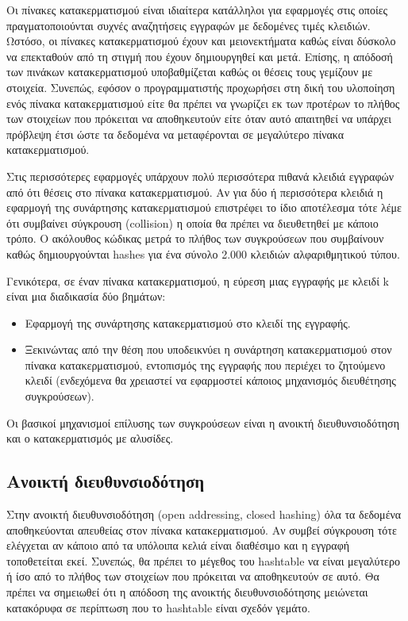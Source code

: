 




Οι πίνακες κατακερματισμού είναι ιδιαίτερα κατάλληλοι για εφαρμογές στις οποίες πραγματοποιούνται συχνές αναζητήσεις εγγραφών με δεδομένες τιμές κλειδιών. Ωστόσο, οι πίνακες κατακερματισμού έχουν και μειονεκτήματα καθώς είναι δύσκολο να επεκταθούν από τη στιγμή που έχουν δημιουργηθεί και μετά. Επίσης, η απόδοσή των πινάκων κατακερματισμού υποβαθμίζεται καθώς οι θέσεις τους γεμίζουν με στοιχεία. Συνεπώς, εφόσον ο προγραμματιστής προχωρήσει στη δική του υλοποίηση ενός πίνακα κατακερματισμού είτε θα πρέπει να γνωρίζει εκ των προτέρων το πλήθος των στοιχείων που πρόκειται να αποθηκευτούν είτε όταν αυτό απαιτηθεί να υπάρχει πρόβλεψη έτσι ώστε τα δεδομένα να μεταφέρονται σε μεγαλύτερο πίνακα κατακερματισμού.

Στις περισσότερες εφαρμογές υπάρχουν πολύ περισσότερα πιθανά κλειδιά εγγραφών από ότι θέσεις στο πίνακα κατακερματισμού. Αν για δύο ή περισσότερα κλειδιά η εφαρμογή της συνάρτησης κατακερματισμού επιστρέφει το ίδιο αποτέλεσμα τότε λέμε ότι συμβαίνει σύγκρουση (collision) η οποία θα πρέπει να διευθετηθεί με κάποιο τρόπο. Ο ακόλουθος κώδικας μετρά το πλήθος των συγκρούσεων που συμβαίνουν καθώς δημιουργούνται hashes για ένα σύνολο 2.000 κλειδιών αλφαριθμητικού τύπου.





Γενικότερα, σε έναν πίνακα κατακερματισμού, η εύρεση μιας εγγραφής με κλειδί k είναι μια διαδικασία δύο βημάτων:
\begin{itemize}[noitemsep]
\item Εφαρμογή της συνάρτησης κατακερματισμού στο κλειδί της εγγραφής.
\item Ξεκινώντας από την θέση που υποδεικνύει η συνάρτηση κατακερματισμού στον πίνακα κατακερματισμού, εντοπισμός της εγγραφής που περιέχει το ζητούμενο κλειδί (ενδεχόμενα θα χρειαστεί να εφαρμοστεί κάποιος μηχανισμός διευθέτησης συγκρούσεων). 
\end{itemize}

Οι βασικοί μηχανισμοί επίλυσης των συγκρούσεων είναι η ανοικτή διευθυνσιοδότηση και ο κατακερματισμός με αλυσίδες.

\subsection{Ανοικτή διευθυνσιοδότηση}
Στην ανοικτή διευθυνσιοδότηση (open addressing, closed hashing) όλα τα δεδομένα αποθηκεύονται απευθείας στον πίνακα κατακερματισμού. Αν συμβεί σύγκρουση τότε ελέγχεται αν κάποιο από τα υπόλοιπα κελιά είναι διαθέσιμο και η εγγραφή τοποθετείται εκεί. Συνεπώς, θα πρέπει το μέγεθος του hashtable να είναι μεγαλύτερο ή ίσο από το πλήθος των στοιχείων που πρόκειται να αποθηκευτούν σε αυτό. Θα πρέπει να σημειωθεί ότι η απόδοση της ανοικτής διευθυνσιοδότησης μειώνεται κατακόρυφα σε περίπτωση που το hashtable είναι σχεδόν γεμάτο. 

